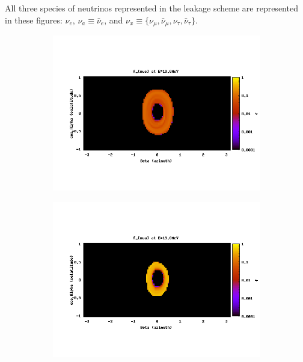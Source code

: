 All three species of neutrinos represented in the leakage scheme are represented
in these figures: $\nu_e$, $\nu_a \equiv \bar{\nu}_e$, and
$\nu_x \equiv \{\nu_\mu,\bar{\nu}_\mu,\nu_\tau,\bar{\nu}_\tau\}$.

\begin{figure}
  \centering
  \begin{subfigure}{.3\textwidth}
    \centering
    \includegraphics[width=1\linewidth]{Figures/f_nue-A-13MeV}
  \end{subfigure}
  \begin{subfigure}{.3\textwidth}
    \centering
    \includegraphics[width=1\linewidth]{Figures/f_nua-A-13MeV}
  \end{subfigure}
  \begin{subfigure}{.3\textwidth}

\end{subfigure}
\end{figure}
